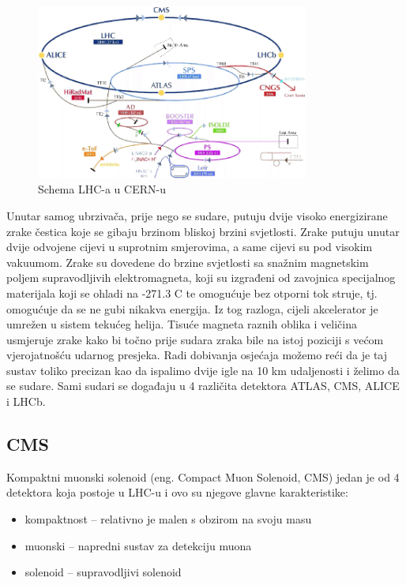 \documentclass[12pt,a4paper,oneside]{article}
\begin{document}
\begin{linenumbers}
		\begin{figure}[h!]
			\centering
			\includegraphics[width=0.8\textwidth]{schema-lhc.png}
			\caption[Saturn viđen u ultraljubičastom svjetlu.]{\label{sl:schema-lhc}Schema LHC-a u CERN-u }
		\end{figure}
		Unutar samog ubrzivača, prije nego se sudare, putuju dvije visoko energizirane zrake čestica koje se gibaju brzinom bliskoj brzini svjetlosti. Zrake putuju unutar dvije odvojene cijevi u suprotnim smjerovima, a same cijevi su pod visokim vakuumom. Zrake su dovedene do brzine svjetlosti sa snažnim magnetskim poljem supravodljivih elektromagneta, koji su izgrađeni od zavojnica specijalnog materijala koji se ohladi na -271.3 \degree C te omogućuje bez otporni tok struje, tj. omogućuje da se ne gubi nikakva energija. Iz tog razloga, cijeli akcelerator je umrežen u sistem tekućeg helija. Tisuće magneta raznih oblika i veličina usmjeruje zrake kako bi točno prije sudara zraka bile na istoj poziciji s većom vjerojatnošću udarnog presjeka. Radi dobivanja osjećaja možemo reći da je taj sustav toliko precizan kao da ispalimo dvije igle na 10 km udaljenosti i želimo da se sudare.
		Sami sudari se događaju u 4 različita detektora ATLAS, CMS, ALICE i LHCb.~\cite{cern-lhc}
		
		\subsection{CMS}
		Kompaktni muonski solenoid (eng. Compact Muon Solenoid, CMS) jedan je od 4 detektora koja postoje u LHC-u i ovo su njegove glavne karakteristike:
		\begin{itemize}
			\item kompaktnost – relativno je malen s obzirom na svoju masu
			\item muonski – napredni sustav za detekciju muona
			\item solenoid – supravodljivi solenoid
		\end{itemize}
	

\end{linenumbers}
\end{document}
